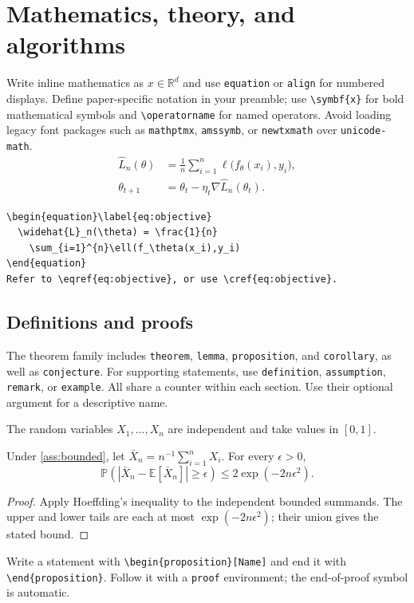 \documentclass[11pt]{article}
\begin{document}
\clearpage
\section{Mathematics, theory, and algorithms}
Write inline mathematics as $x\in\mathbb{R}^{d}$ and use \texttt{equation} or
\texttt{align} for numbered displays. Define paper-specific notation in your
preamble; use \verb|\symbf{x}| for bold mathematical symbols and
\verb|\operatorname| for named operators. Avoid loading legacy font packages
such as \texttt{mathptmx}, \texttt{amssymb}, or \texttt{newtxmath} over
\texttt{unicode-math}.
\begin{align}
  \widehat{L}_n(\theta) &= \frac{1}{n}\sum_{i=1}^{n}
    \ell\bigl(f_\theta(x_i),y_i\bigr), \label{eq:risk}\\
  \theta_{t+1} &= \theta_t-\eta_t\nabla\widehat{L}_n(\theta_t). \label{eq:update}
\end{align}
\begin{lstlisting}
\begin{equation}\label{eq:objective}
  \widehat{L}_n(\theta) = \frac{1}{n}
    \sum_{i=1}^{n}\ell(f_\theta(x_i),y_i)
\end{equation}
Refer to \eqref{eq:objective}, or use \cref{eq:objective}.
\end{lstlisting}

\subsection{Definitions and proofs}
The theorem family includes \texttt{theorem}, \texttt{lemma}, \texttt{proposition},
and \texttt{corollary}, as well as \texttt{conjecture}. For supporting statements,
use \texttt{definition}, \texttt{assumption}, \texttt{remark}, or \texttt{example}.
All share a counter within each section. Use their optional argument for a descriptive name.
\begin{assumption}\label{ass:bounded}
The random variables $X_1,\ldots,X_n$ are independent and take values in $[0,1]$.
\end{assumption}
\begin{proposition}\label{prop:bound}
Under \cref{ass:bounded}, let $\bar X_n=n^{-1}\sum_{i=1}^{n}X_i$.
For every $\epsilon>0$,
\[
  \mathbb{P}\!\left(\left|\bar X_n-\mathbb{E}[\bar X_n]\right|\geq\epsilon\right)
  \leq 2\exp(-2n\epsilon^2).
\]
\end{proposition}
\begin{proof}
Apply Hoeffding's inequality to the independent bounded summands. The
upper and lower tails are each at most $\exp(-2n\epsilon^2)$; their union gives
the stated bound.
\end{proof}
Write a statement with \verb|\begin{proposition}[Name]| and end it with
\verb|\end{proposition}|. Follow it with a \texttt{proof} environment; the
end-of-proof symbol is automatic.
\end{document}
